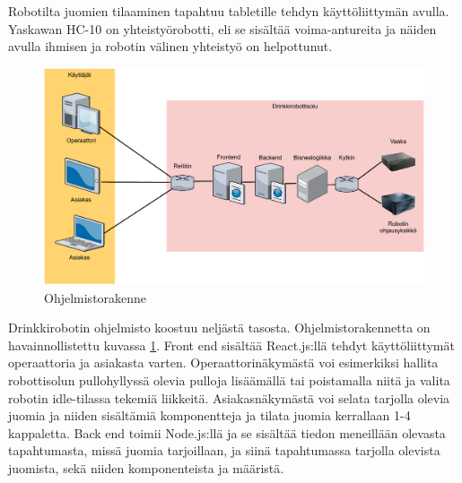 \newpage

Robotilta juomien tilaaminen tapahtuu tabletille tehdyn käyttöliittymän avulla. Yaskawan HC-10 on yhteistyörobotti, eli se sisältää voima-antureita ja näiden avulla ihmisen ja robotin välinen yhteistyö on helpottunut. \cite{Pullonkaula2020}

\begin{figure}[h]
\begin{center}
\includegraphics[scale=0.6]{img/rakenne.pdf}
\end{center}
\caption{Ohjelmistorakenne \cite[s. 11]{Kemppi2021}}
\label{fig:rakenne}
\end{figure}

Drinkkirobotin ohjelmisto koostuu neljästä tasosta. Ohjelmistorakennetta on havainnollistettu kuvassa \ref{fig:rakenne}. Front end sisältää React.js:llä tehdyt käyttöliittymät operaattoria ja asiakasta varten. Operaattorinäkymästä voi esimerkiksi hallita robottisolun pullohyllyssä olevia pulloja lisäämällä tai poistamalla niitä ja valita robotin idle\hyp{}tilassa tekemiä liikkeitä. Asiakasnäkymästä voi selata tarjolla olevia juomia ja niiden sisältämiä komponentteja ja tilata juomia kerrallaan 1\hyp{}4 kappaletta. Back end toimii Node.js:llä ja se sisältää tiedon meneillään olevasta tapahtumasta, missä juomia tarjoillaan, ja siinä tapahtumassa tarjolla olevista juomista, sekä niiden komponenteista ja määristä.

